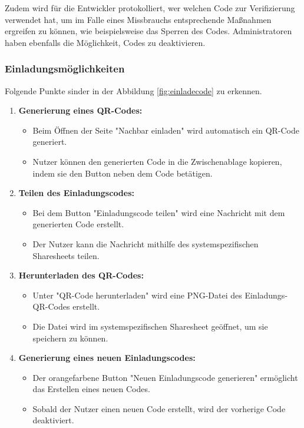 Zudem wird für die Entwickler protokolliert, wer welchen
Code zur Verifizierung verwendet hat, um im Falle eines
Missbrauchs entsprechende Maßnahmen ergreifen zu können, wie
beispielsweise das Sperren des Codes. Administratoren haben
ebenfalls die Möglichkeit, Codes zu deaktivieren.
\subsubsection{Einladungsmöglichkeiten}


Folgende Punkte sinder in der Abbildung
\ref{fig:einladecode} zu erkennen.


\begin{enumerate}[label=\arabic*.]
  \item \textbf{Generierung eines QR-Codes:}
        \begin{itemize}
          \item Beim Öffnen der Seite "Nachbar einladen" wird automatisch ein QR-Code generiert.
          \item Nutzer können den generierten Code in die Zwischenablage kopieren, indem sie den Button neben dem Code betätigen.
        \end{itemize}

  \item \textbf{Teilen des Einladungscodes:}
        \begin{itemize}
          \item Bei dem Button "Einladungscode teilen" wird eine Nachricht mit dem generierten Code erstellt.
          \item Der Nutzer kann die Nachricht mithilfe des systemspezifischen Sharesheets teilen.
        \end{itemize}

  \item \textbf{Herunterladen des QR-Codes:}
        \begin{itemize}
          \item Unter "QR-Code herunterladen" wird eine PNG-Datei des Einladungs-QR-Codes erstellt.
          \item Die Datei wird im systemspezifischen Sharesheet geöffnet, um sie speichern zu können.
        \end{itemize}

  \item \textbf{Generierung eines neuen Einladungscodes:}
        \begin{itemize}
          \item Der orangefarbene Button "Neuen Einladungscode generieren" ermöglicht das Erstellen eines neuen Codes.
          \item Sobald der Nutzer einen neuen Code erstellt, wird der vorherige Code deaktiviert.
        \end{itemize}
\end{enumerate}

